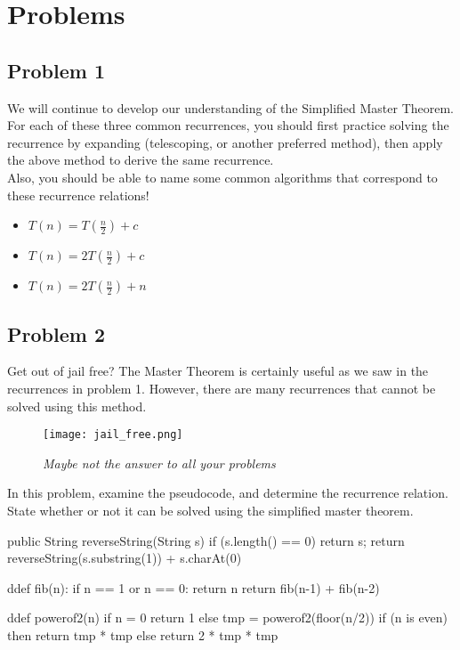 \section*{Problems}

\subsection*{Problem 1}
We will continue to develop our understanding of the Simplified Master Theorem. For each of these three common recurrences, you should first practice solving the recurrence by expanding (telescoping, or another preferred method), then apply the above method to derive the same recurrence. \\
Also, you should be able to name some common algorithms that correspond to these recurrence relations! 

\begin{itemize}
    \item $T(n) = T(\frac{n}{2}) + c$
    \item $T(n) = 2T(\frac{n}{2}) + c$
    \item $T(n) = 2T(\frac{n}{2}) + n$
\end{itemize}

\subsection*{Problem 2}
Get out of jail free? The Master Theorem is certainly useful as we saw in the recurrences in problem 1. However, there are many recurrences that cannot be solved using this method. 
\begin{figure}[ht]
    \centering
    \texttt{[image: jail\_free.png]}
    \caption*{\textit{Maybe not the answer to all your problems}}
\end{figure}
In this problem, examine the pseudocode, and determine the recurrence relation. State whether or not it can be solved using the simplified master theorem.

\begin{java}
    public String reverseString(String s) {
        if (s.length() == 0) {
            return s;
        }
        return reverseString(s.substring(1)) + s.charAt(0)
    }
\end{java}

\begin{code}
    ddef fib(n):
        if n == 1 or n == 0:
            return n
        return fib(n-1) + fib(n-2)
\end{code}

\begin{code}
    ddef powerof2(n)
        if n = 0
            return 1 
        else
            tmp = powerof2(floor(n/2))
            if (n is even) then
              return tmp * tmp
            else
              return 2 * tmp * tmp
\end{code}

